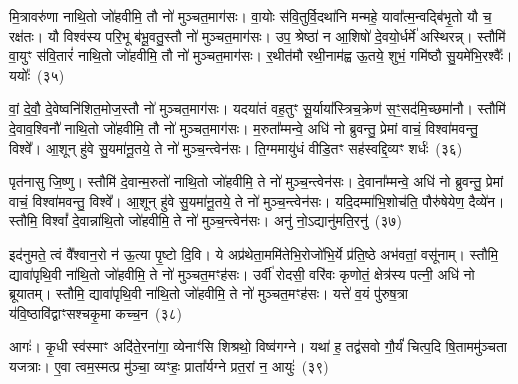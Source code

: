 मि॒त्रावरु॑णा नाथि॒तो जो॑हवीमि॒ तौ नो॑ मुञ्चत॒माग॑सः। वा॒योः स॑वि॒तुर्वि॒दथा॑नि मन्महे॒ यावा᳚त्म॒न्वद्बि॑भृ॒तो यौ च॒ रक्ष॑तः। यौ विश्व॑स्य परि॒भू ब॑भू॒वतु॒स्तौ नो॑ मुञ्चत॒माग॑सः। उप॒ श्रेष्ठा॑ न आ॒शिषो॑ दे॒वयो॒र्धर्मे॑ अस्थिरन्न्। स्तौमि॑ वा॒युꣳ स॑वि॒तारं॑ नाथि॒तो जो॑हवीमि॒ तौ नो॑ मुञ्चत॒माग॑सः। र॒थीत॑मौ रथी॒नाम॑ह्व ऊ॒तये॒ शुभं॒ गमि॑ष्ठौ सु॒यमे॑भि॒रश्वैः᳚। ययोः᳚~(३५)

वां॒ दे॒वौ॒ दे॒वेष्वनि॑शित॒मोज॒स्तौ नो॑ मुञ्चत॒माग॑सः। यदया॑तं वह॒तुꣳ सू॒र्याया᳚स्त्रिच॒क्रेण॑ स॒ꣳ॒सद॑मि॒च्छमा॑नौ। स्तौमि॑ दे॒वाव॒श्विनौ॑ नाथि॒तो जो॑हवीमि॒ तौ नो॑ मुञ्चत॒माग॑सः। म॒रुता᳚म्मन्वे॒ अधि॑ नो ब्रुवन्तु॒ प्रेमां वाचं॒ विश्वा॑मवन्तु॒ विश्वे᳚। आ॒शून् हु॑वे सु॒यमा॑नू॒तये॒ ते नो॑ मुञ्च॒न्त्वेन॑सः। ति॒ग्ममायु॑धं वीडि॒तꣳ सह॑स्वद्दि॒व्यꣳ शर्धः॑~(३६)

पृत॑नासु जि॒ष्णु। स्तौमि॑ दे॒वान्म॒रुतो॑ नाथि॒तो जो॑हवीमि॒ ते नो॑ मुञ्च॒न्त्वेन॑सः। दे॒वाना᳚म्मन्वे॒ अधि॑ नो ब्रुवन्तु॒ प्रेमां वाचं॒ विश्वा॑मवन्तु॒ विश्वे᳚। आ॒शून् हु॑वे सु॒यमा॑नू॒तये॒ ते नो॑ मुञ्च॒न्त्वेन॑सः। यदि॒दम्मा॑भि॒शोच॑ति॒ पौरु॑षेयेण॒ दैव्ये॑न। स्तौमि॒ विश्वां᳚ दे॒वान्ना॑थि॒तो जो॑हवीमि॒ ते नो॑ मुञ्च॒न्त्वेन॑सः। अनु॑ नो॒\-ऽद्यानु॑मति॒रनु॑~(३७)

इद॑नुमते॒ त्वं वै᳚श्वान॒रो न॑ ऊ॒त्या पृ॒ष्टो दि॒वि। ये अप्र॑थेता॒ममि॑तेभि॒रोजो॑भि॒र्ये प्र॑ति॒ष्ठे अभ॑वतां॒ वसू॑नाम्। स्तौमि॒ द्यावा॑पृथि॒वी ना॑थि॒तो जो॑हवीमि॒ ते नो॑ मुञ्चत॒मꣳह॑सः। उर्वी॑ रोदसी॒ वरि॑वः कृणोतं॒ क्षेत्र॑स्य पत्नी॒ अधि॑ नो ब्रूयातम्। स्तौमि॒ द्यावा॑पृथि॒वी ना॑थि॒तो जो॑हवीमि॒ ते नो॑ मुञ्चत॒मꣳह॑सः। यत्ते॑ व॒यं पु॑रुष॒त्रा य॑वि॒ष्ठावि॑द्वाꣳसश्चकृ॒मा कच्च॒न~(३८)

आगः॑। कृ॒धी स्व॑स्माꣳ अदि॑ते॒रना॑गा॒ व्येनाꣳ॑सि शिश्रथो॒ विष्व॑गग्ने। यथा॑ ह॒ तद्व॑सवो गौ॒र्यं॑ चित्प॒दि षि॒ताममु॑ञ्चता यजत्राः। ए॒वा त्वम॒स्मत्प्र मु॑ञ्चा॒ व्यꣳहः॒ प्राता᳚र्यग्ने प्रत॒रां न॒ आयुः॑~(३९)


{\anuvakamend[{गन्ता॑ दू॒षय॒न्थ्स्तौमि॒ ययोः॒ शर्धो\-ऽनु॑मति॒रनु॑ च॒न चतु॑स्त्रिꣳशच्च}]}%

{\anuvakamend[{अ॒ग्निष्ट्वा॑ वा॒मश्वो॒ द्विच॑त्वारिꣳशच्च}]}%

